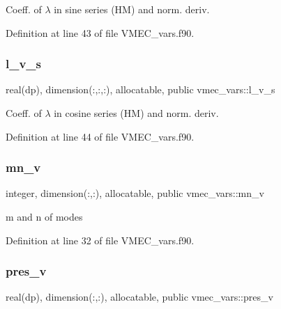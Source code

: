 Coeff. of $\lambda$ in sine series (HM) and norm. deriv. 



Definition at line 43 of file V\+M\+E\+C\+\_\+vars.\+f90.

\mbox{\label{namespacevmec__vars_a5d1de7879021fa8c1d8c10bbef01f9c7}} 
\subsubsection{\texorpdfstring{l\+\_\+v\+\_\+s}{l\_v\_s}}
{\footnotesize\ttfamily real(dp), dimension(\+:,\+:,\+:), allocatable, public vmec\+\_\+vars\+::l\+\_\+v\+\_\+s}



Coeff. of $\lambda$ in cosine series (HM) and norm. deriv. 



Definition at line 44 of file V\+M\+E\+C\+\_\+vars.\+f90.

\mbox{\label{namespacevmec__vars_a4b9a64bc60d45f2b10e03f624ade3e82}} 
\subsubsection{\texorpdfstring{mn\+\_\+v}{mn\_v}}
{\footnotesize\ttfamily integer, dimension(\+:,\+:), allocatable, public vmec\+\_\+vars\+::mn\+\_\+v}



m and n of modes 



Definition at line 32 of file V\+M\+E\+C\+\_\+vars.\+f90.

\mbox{\label{namespacevmec__vars_a958baf9fece8a4a001b6d8d767b48179}} 
\subsubsection{\texorpdfstring{pres\+\_\+v}{pres\_v}}
{\footnotesize\ttfamily real(dp), dimension(\+:,\+:), allocatable, public vmec\+\_\+vars\+::pres\+\_\+v}



